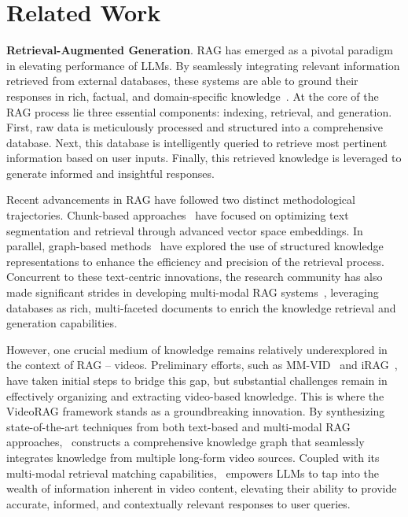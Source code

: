 \section{Related Work}
\textbf{Retrieval-Augmented Generation}. 
RAG has emerged as a pivotal paradigm in elevating performance of LLMs. By seamlessly integrating relevant information retrieved from external databases, these systems are able to ground their responses in rich, factual, and domain-specific knowledge~\cite{LightRAG, MemoRAG, RAGSurvey}. At the core of the RAG process lie three essential components: indexing, retrieval, and generation. First, raw data is meticulously processed and structured into a comprehensive database. Next, this database is intelligently queried to retrieve most pertinent information based on user inputs. Finally, this retrieved knowledge is leveraged to generate informed and insightful responses.

Recent advancements in RAG have followed two distinct methodological trajectories. Chunk-based approaches~\cite{NaiveRAG, ChunkRAG, RQ-RAG} have focused on optimizing text segmentation and retrieval through advanced vector space embeddings. In parallel, graph-based methods~\cite{GraphRAG, LightRAG, SubgraphRAG} have explored the use of structured knowledge representations to enhance the efficiency and precision of the retrieval process. Concurrent to these text-centric innovations, the research community has also made significant strides in developing multi-modal RAG systems~\cite{VisRAG, ColPali, MM-VID}, leveraging databases as rich, multi-faceted documents to enrich the knowledge retrieval and generation capabilities.

However, one crucial medium of knowledge remains relatively underexplored in the context of RAG – videos. Preliminary efforts, such as MM-VID~\cite{MM-VID} and iRAG~\cite{iRAG}, have taken initial steps to bridge this gap, but substantial challenges remain in effectively organizing and extracting video-based knowledge. This is where the VideoRAG framework stands as a groundbreaking innovation. By synthesizing state-of-the-art techniques from both text-based and multi-modal RAG approaches, \model\ constructs a comprehensive knowledge graph that seamlessly integrates knowledge from multiple long-form video sources. Coupled with its multi-modal retrieval matching capabilities, \model\ empowers LLMs to tap into the wealth of information inherent in video content, elevating their ability to provide accurate, informed, and contextually relevant responses to user queries.

